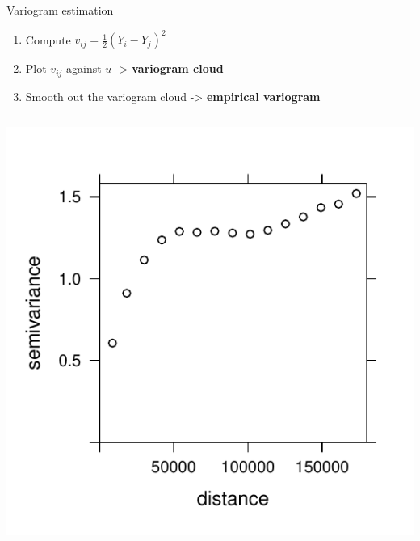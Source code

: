 \documentclass[
  ignorenonframetext,
]{beamer}
\providecommand{\tightlist}{%
  \setlength{\itemsep}{0pt}\setlength{\parskip}{0pt}}
\begin{document}
\begin{frame}{Variogram estimation}
\small

\begin{enumerate}
\tightlist
\item
  Compute \(v_{ij}=\frac{1}{2}\left(Y_i-Y_j\right)^2\)
\item
  Plot \(v_{ij}\) against \(u\) -\textgreater{} \textbf{variogram cloud}
\item
  Smooth out the variogram cloud -\textgreater{} \textbf{empirical
  variogram}
\end{enumerate}

\begin{columns}[T]
\begin{column}{0.48\textwidth}
\includegraphics{Lecture_1_files/figure-beamer/unnamed-chunk-53-1.pdf}
\end{column}


\end{columns}
\end{frame}
\end{document}
